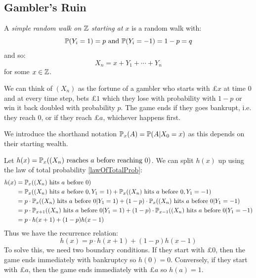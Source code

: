 \documentclass[../main.tex]{subfiles}
\begin{document}
\subsection{Gambler's Ruin}
\begin{definition}
  A \textit{simple random walk on $\Z$ starting at $x$} is a random walk with:
  \[
    \P(Y_i = 1) = p \text{ and } \P(Y_i = -1) = 1 - p = q
  \]
  and so:
  \[
    X_n = x + Y_1 + \cdots + Y_n
  \]
  for some $x \in \Z$.
\end{definition}
We can think of $(X_n)$ as the fortune of a gambler who starts with £$x$ at time 0 and at every time step, bets £$1$ which they lose with probability with $1 - p$ or win it back doubled with probability $p$.
The game ends if they goes bankrupt, i.e. they reach 0, or if they reach £$a$, whichever happens first.
\begin{remark}[Notation]
  We introduce the shorthand notation $\P_x(A) = \P(A \vert X_0 = x)$ as this depends on their starting wealth.
\end{remark}
Let $h(x) = \P_x((X_n) \text{ reaches $a$ before reaching $0$})$.
We can split $h(x)$ up using the law of total probability \cref{lawOfTotalProb}:
\begin{align*}
  h(x) &= \P_x((X_n) \text{ hits $a$ before 0}) \\
       &= \P_x((X_n) \text{ hits $a$ before 0}, Y_1 = 1) + \P_x((X_n) \text{ hits $a$ before 0}, Y_1 = -1) \\
       &= p \cdot \P_x((X_n) \text{ hits $a$ before 0}\vert Y_1 = 1) + (1 - p) \cdot \P_x((X_n) \text{ hits $a$ before 0}\vert Y_1 = -1) \\
       &= p \cdot \P_{x + 1}((X_n) \text{ hits $a$ before 0}\vert Y_1 = 1) + (1 - p) \cdot \P_{x - 1}((X_n) \text{ hits $a$ before 0}\vert Y_1 = -1) \\
       &= p \cdot h(x + 1) + (1 - p) h(x - 1)
\end{align*}
Thus we have the recurrence relation:
\[
  h(x) = p \cdot h(x + 1) + (1 - p) h(x - 1)
\]
To solve this, we need two boundary conditions.
If they start with £$0$, then the game ends immediately with bankruptcy so $h(0) = 0$.
Conversely, if they start with £$a$, then the game ends immediately with £$a$ so $h(a) = 1$.
\end{document}

